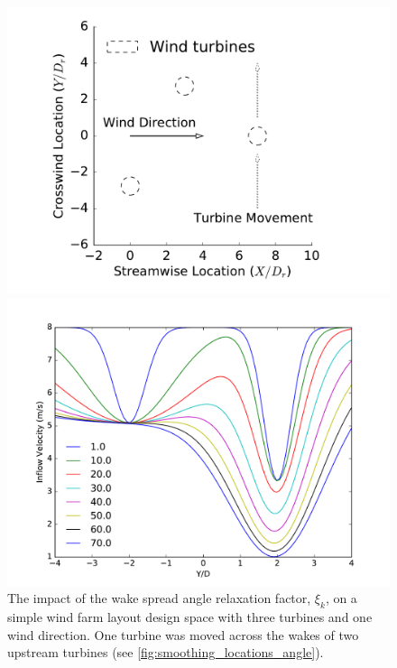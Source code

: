 \documentclass[a4paper]{jpconf}
\begin{document}
\begin{figure}[ht]
	\centering
	\begin{minipage}[t]{0.43\textwidth}
		\centering
		\includegraphics[width=\textwidth, trim={2cm 0cm 2cm 0cm}, clip]{smoothing_locations}
		\caption{Simple design space used to demonstrate the effects of the wake spreading angle relaxation factor, $\xi_k$, on the wind farm layout design space (see \cref{fig:wec_angle_cross_section}).}
		\label{fig:smoothing_locations_angle}
	\end{minipage}\hspace{1pc}%
	\begin{minipage}[t]{0.52\textwidth}
		\centering
		\includegraphics[width=\textwidth]{angle}
		\caption{The impact of the wake spread angle relaxation factor, $\xi_k$, on a simple wind farm layout design space with three turbines and one wind direction. One turbine was moved across the wakes of two upstream turbines (see \cref{fig:smoothing_locations_angle}). }
		\label{fig:wec_angle_cross_section}
	\end{minipage} 
\end{figure}
\end{document}
